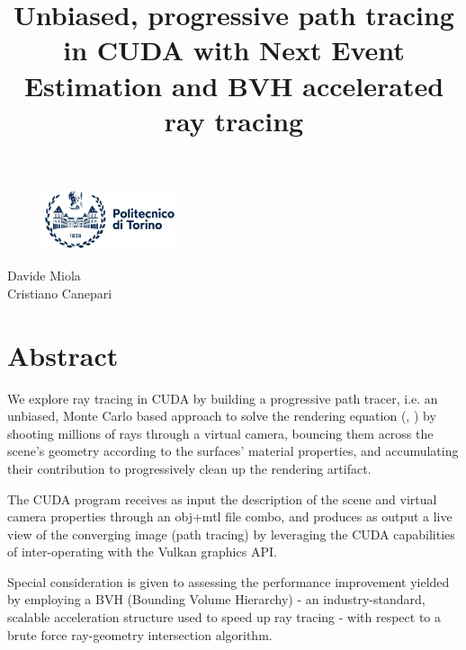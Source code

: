 \documentclass[12pt,a4paper]{article}
\begin{document}
\begin{figure}[b]
\centering
\includegraphics[width=0.35\textwidth]{logo_polito}
\end{figure}

\title{Unbiased, progressive path tracing in CUDA with Next Event Estimation and BVH accelerated ray tracing}
\author{}
\maketitle
\vspace{10cm}
\begin{center}Davide Miola\\Cristiano Canepari\end{center}

\newpage

\tableofcontents
\newpage

\setcounter{page}{1}
\rfoot{\thepage}

\section{Abstract}

We explore ray tracing in CUDA by building a progressive path tracer, i.e. an unbiased, Monte Carlo based approach to solve the rendering equation (\cite{10.1145/15886.15901}, \cite{10.1145/15886.15902}) by shooting millions of rays through a virtual camera, bouncing them across the scene's geometry according to the surfaces' material properties, and accumulating their contribution to progressively clean up the rendering artifact.

The CUDA program receives as input the description of the scene and virtual camera properties through an obj+mtl file combo, and produces as output a live view of the converging image (path tracing) by leveraging the CUDA capabilities of inter-operating with the Vulkan graphics API.

Special consideration is given to assessing the performance improvement yielded by employing a BVH (Bounding Volume Hierarchy) - an industry-standard, scalable acceleration structure used to speed up ray tracing - with respect to a brute force ray-geometry intersection algorithm.
\end{document}
